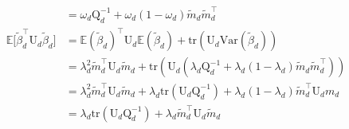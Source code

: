 \documentclass[twoside,11pt]{article}
\newcommand{\transpose}[1]{#1^{\intercal}}
\newcommand{\E}{\mathbb{E}}
\newcommand{\betad}{\tilde{\beta}_d}
\newcommand{\umat}{\mathrm{U}}
\newcommand{\qmat}{\mathrm{Q}}
\newcommand{\trace}[1]{\mathrm{tr} \left( #1 \right)}
\newcommand{\var}[1]{\mathrm{Var}\left(#1\right)}
\begin{document}
\begin{align*}
	&= \omega_d \qmat_d^{-1} + \omega_d(1-\omega_d) \tilde{m}_d \transpose{\tilde{m}_d} \\
	\E \Big[ \transpose{\betad} \umat_d \betad \Big] &= \transpose{\E(\betad)} \umat_d \E(\betad) + \trace{\umat_d \var{\betad}} \\
	&= \lambda_d^2 \transpose{\tilde{m}_d} \umat_d \tilde{m}_d + \trace{\umat_d \left( \lambda_d \qmat_d^{-1} + \lambda_d(1-\lambda_d)\tilde{m}_d \transpose{\tilde{m}_d} \right)} \\
	&= \lambda_d^2 \transpose{\tilde{m}_d} \umat_d \tilde{m}_d + \lambda_d \trace{\umat_d\qmat_d^{-1}} + \lambda_d(1 - \lambda_d)\transpose{\tilde{m}_d}\umat_dm_d \\
	&= \lambda_d \trace{\umat_d \qmat_d^{-1}} + \lambda_d \transpose{\tilde{m}_d} \umat_d \tilde{m}_d
\end{align*}
\end{document}
